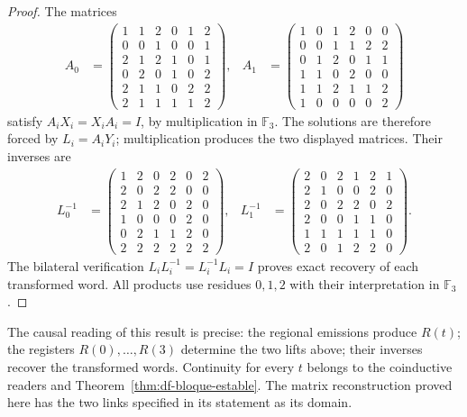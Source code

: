 \begin{proof}
The matrices
\begin{align*}
 A_0&=\begin{pmatrix}
1&1&2&0&1&2\\0&0&1&0&0&1\\2&1&2&1&0&1\\
0&2&0&1&0&2\\2&1&1&0&2&2\\2&1&1&1&1&2
\end{pmatrix},&
 A_1&=\begin{pmatrix}
1&0&1&2&0&0\\0&0&1&1&2&2\\0&1&2&0&1&1\\
1&1&0&2&0&0\\1&1&2&1&1&2\\1&0&0&0&0&2
\end{pmatrix}
\end{align*}
satisfy \(A_iX_i=X_iA_i=I\), by multiplication in \(\mathbb F_3\).
The solutions are therefore forced by \(L_i=A_iY_i\); multiplication
produces the two displayed matrices. Their inverses are
\begin{align*}
 L_0^{-1}&=\begin{pmatrix}
1&2&0&2&0&2\\2&0&2&2&0&0\\2&1&2&0&2&0\\
1&0&0&0&2&0\\0&2&1&1&2&0\\2&2&2&2&2&2
\end{pmatrix},&
 L_1^{-1}&=\begin{pmatrix}
2&0&2&1&2&1\\2&1&0&0&2&0\\2&0&2&2&0&2\\
2&0&0&1&1&0\\1&1&1&1&1&0\\2&0&1&2&2&0
\end{pmatrix}.
\end{align*}
The bilateral verification \(L_iL_i^{-1}=L_i^{-1}L_i=I\) proves exact
recovery of each transformed word. All products use residues \(0,1,2\)
with their interpretation in \(\mathbb F_3\).
\end{proof}

The causal reading of this result is precise: the regional emissions
produce \(R(t)\); the registers \(R(0),\ldots,R(3)\) determine the two
lifts above; their inverses recover the transformed words. Continuity
for every \(t\) belongs to the coinductive readers and
Theorem~\ref{thm:df-bloque-estable}. The matrix reconstruction proved here
has the two links specified in its statement as its domain.

